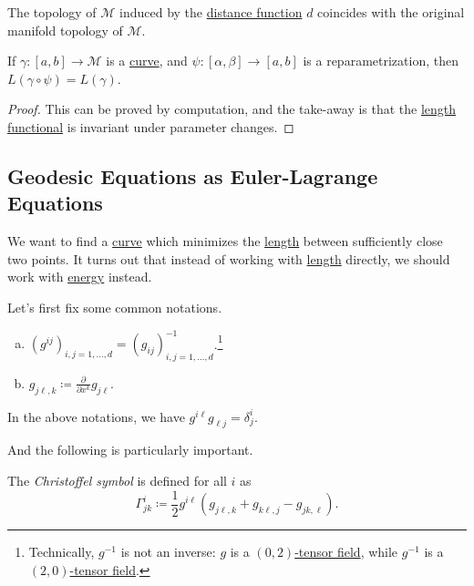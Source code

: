 \begin{corollary}
	The topology of \(\mathcal{M} \) induced by the \hyperref[def:distance]{distance function} \(d\) coincides with the original manifold topology of \(\mathcal{M} \).
\end{corollary}

\begin{lemma}
	If \(\gamma\colon [a, b] \to \mathcal{M} \) is a \hyperref[def:curve]{curve}, and \(\psi \colon [\alpha , \beta ] \to [a, b]\) is a reparametrization, then \(L(\gamma \circ \psi ) = L(\gamma )\).
\end{lemma}
\begin{proof}
	This can be proved by computation, and the take-away is that the \hyperref[def:length]{length functional} is invariant under parameter changes.
\end{proof}

\subsection{Geodesic Equations as Euler-Lagrange Equations}
We want to find a \hyperref[def:curve]{curve} which minimizes the \hyperref[def:length]{length} between sufficiently close two points. It turns out that instead of working with \hyperref[def:length]{length} directly, we should work with \hyperref[def:energy]{energy} instead.

\begin{notation}
	Let's first fix some common notations.

	\begin{enumerate}[(a)]
		\item \(\left( g^{ij} \right) _{i, j=1, \dots , d} = \left( g_{ij} \right)_{i, j = 1, \dots , d} ^{-1} \).\footnote{Technically, \(g^{-1} \) is not an inverse: \(g\) is a \hyperref[def:tensor-field]{\((0, 2)\)-tensor field}, while \(g^{-1} \) is a \hyperref[def:tensor-field]{\((2, 0)\)-tensor field}.}
		\item \(g_{j \ell , k} \coloneqq \frac{\partial }{\partial x^k} g_{j \ell }\).
	\end{enumerate}
\end{notation}

\begin{note}
	In the above notations, we have \(g^{i \ell} g_{\ell j}=\delta ^i_j \).
\end{note}

And the following is particularly important.

\begin{notation}\label{not:Christoffel-symbol}
	The \emph{Christoffel symbol} is defined for all \(i\) as
	\[
		\Gamma ^i_{jk} \coloneqq \frac{1}{2}g^{i \ell }\left( g_{j \ell , k} + g_{k \ell , j} - g_{jk, \ell }\right).
	\]
\end{notation}

